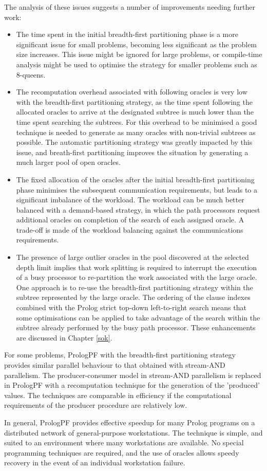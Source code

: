 The analysis of these issues suggests a number of improvements needing further work:
\begin{itemize}
\item{The time spent in the initial breadth-first partitioning phase is a more
  significant issue for small problems, becoming less significant as the problem size
  increases.  This issue might be ignored for large problems, or compile-time analysis
  might be used to optimise the strategy for smaller problems such as 8-queens.}
\item{The recomputation overhead associated with following oracles is very low with the
  breadth-first partitioning strategy, as the time spent following the allocated oracles
  to arrive at the designated subtree is much lower than the time spent searching the
  subtrees.  For this overhead to be minimised a good technique is needed to generate
  as many oracles with non-trivial subtrees as possible.  The automatic partitioning
  strategy \cite{Kle91, Sar95} was greatly impacted by this issue,  and breath-first
  partitioning improves the situation by generating a much larger pool of open oracles.}
\item{The fixed allocation of the oracles after the initial breadth-first partitioning
  phase minimises the subsequent communication requirements, but leads to a significant
  imbalance of the workload.  The workload can be much better balanced with a demand-based
  strategy, in which the path processors request additional oracles on completion of the
  search of each assigned oracle.  A trade-off is made of the workload balancing against
  the communications requirements.}
\item{The presence of large outlier oracles in the pool discovered at the
  selected depth limit implies that work splitting is required to interrupt the execution
  of a busy processor to re-partition the work associated with the large oracle. One
  approach is to re-use the breadth-first partitioning strategy within
  the subtree represented by the large oracle.  The ordering of the clause indexes combined
  with the Prolog strict top-down left-to-right search means that some optimisations can
  be applied to take advantage of the search within the subtree already performed by the
  busy path processor.  These enhancements are discussed in Chapter \ref{sok}.}
\end{itemize}

For some problems, PrologPF with the breadth-first partitioning strategy provides similar
parallel behaviour to that obtained with stream-AND parallelism.  The producer-consumer
model in stream-AND parallelism is replaced in PrologPF with a recomputation technique
for the generation of the 'produced' values.  The techniques are comparable in
efficiency  if the computational requirements of the
producer procedure are relatively low.

In general, PrologPF provides effective speedup for many Prolog programs on a
distributed network of general-purpose workstations.  The technique is simple, and
suited to an environment where many workstations are available.  No special programming
techniques are required, and the use of oracles allows speedy recovery in the event
of an individual workstation failure.



